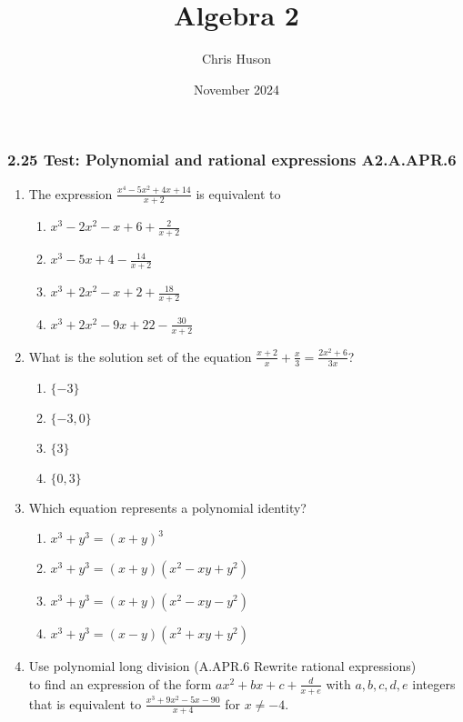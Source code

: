 \documentclass[12pt, twoside]{article}
\title{Algebra 2}
\author{Chris Huson}
\date{November 2024}
\begin{document}
\subsubsection*{2.25 Test: Polynomial and rational  expressions \hfill A2.A.APR.6}
\begin{enumerate}[itemsep=0.5cm]

\item The expression $\displaystyle \frac{x^4 - 5x^2 + 4x + 14}{x+2}$ is equivalent to
    \begin{enumerate}
        \item $\displaystyle x^3 - 2x^2 - x + 6 + \frac{2}{x + 2}$
        \item $\displaystyle x^3 - 5x + 4 - \frac{14}{x + 2}$
        \item $\displaystyle x^3 + 2x^2 - x + 2 + \frac{18}{x + 2}$
        \item $\displaystyle x^3 + 2x^2 - 9x + 22 - \frac{30}{x + 2}$
    \end{enumerate} \vspace{3cm}
    
\item What is the solution set of the equation \(\displaystyle \frac{x+2}{x} + \frac{x}{3} = \frac{2x^2+6}{3x}\)?
    \begin{enumerate}
        \item \(\{-3\}\)
        \item \(\{-3, 0\}\)
        \item \(\{3\}\)
        \item \(\{0, 3\}\)
    \end{enumerate} \vspace{3cm}
    
\item Which equation represents a polynomial identity? %
    \begin{enumerate}
        \item \(x^3 + y^3 = (x + y)^3\)
        \item \(x^3 + y^3 = (x + y)(x^2 - xy + y^2)\)
        \item \(x^3 + y^3 = (x + y)(x^2 - xy - y^2)\)
        \item \(x^3 + y^3 = (x - y)(x^2 + xy + y^2)\)
    \end{enumerate}
    
\newpage 
\item Use polynomial long division \hfill (A.APR.6 Rewrite rational expressions) \\[0.5cm] 
to find an expression of the form $ax^2 + bx +c +\frac{d}{x+e}$ with $a,b,c,d,e$ integers that is equivalent to $\displaystyle \frac{x^3 + 9x^2 - 5x - 90}{x + 4}
$ for $x \neq -4$.
\vspace{10cm}


\end{enumerate}
\end{document}
